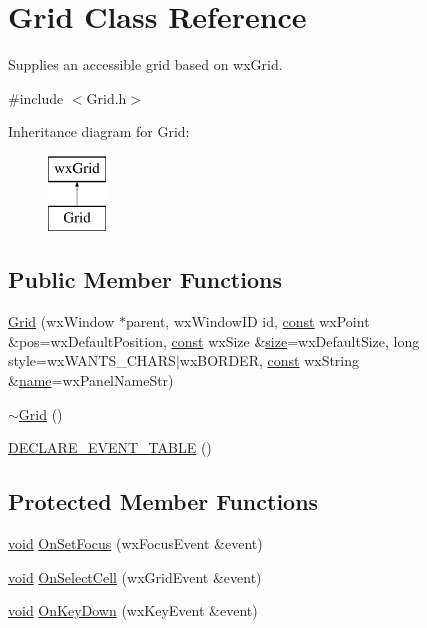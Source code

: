 \hypertarget{class_grid}{}\section{Grid Class Reference}
\label{class_grid}


Supplies an accessible grid based on wx\+Grid.  




{\ttfamily \#include $<$Grid.\+h$>$}

Inheritance diagram for Grid\+:\begin{figure}[H]
\begin{center}
\leavevmode
\includegraphics[height=2.000000cm]{class_grid}
\end{center}
\end{figure}
\subsection*{Public Member Functions}
\begin{DoxyCompactItemize}
\item 
\hyperlink{class_grid_ac23d188d142fd0e099af6c47314a864c}{Grid} (wx\+Window $\ast$parent, wx\+Window\+ID id, \hyperlink{getopt1_8c_a2c212835823e3c54a8ab6d95c652660e}{const} wx\+Point \&pos=wx\+Default\+Position, \hyperlink{getopt1_8c_a2c212835823e3c54a8ab6d95c652660e}{const} wx\+Size \&\hyperlink{group__lavu__mem_ga854352f53b148adc24983a58a1866d66}{size}=wx\+Default\+Size, long style=wx\+W\+A\+N\+T\+S\+\_\+\+C\+H\+A\+RS$\vert$wx\+B\+O\+R\+D\+ER, \hyperlink{getopt1_8c_a2c212835823e3c54a8ab6d95c652660e}{const} wx\+String \&\hyperlink{lib_2expat_8h_a1b49b495b59f9e73205b69ad1a2965b0}{name}=wx\+Panel\+Name\+Str)
\item 
\hyperlink{class_grid_a3661d0a7f998caaaf8627d7a67072116}{$\sim$\+Grid} ()
\item 
\hyperlink{class_grid_a08e6bf52084631d71ba42d0cf6f0290d}{D\+E\+C\+L\+A\+R\+E\+\_\+\+E\+V\+E\+N\+T\+\_\+\+T\+A\+B\+LE} ()
\end{DoxyCompactItemize}
\subsection*{Protected Member Functions}
\begin{DoxyCompactItemize}
\item 
\hyperlink{sound_8c_ae35f5844602719cf66324f4de2a658b3}{void} \hyperlink{class_grid_a931fa5ef31befdac9d2f04384e54772f}{On\+Set\+Focus} (wx\+Focus\+Event \&event)
\item 
\hyperlink{sound_8c_ae35f5844602719cf66324f4de2a658b3}{void} \hyperlink{class_grid_a4b6e0f4d4867bdecb3a3e6c623918780}{On\+Select\+Cell} (wx\+Grid\+Event \&event)
\item 
\hyperlink{sound_8c_ae35f5844602719cf66324f4de2a658b3}{void} \hyperlink{class_grid_a4b0a0a3ba6ed37661b3ffb05538ab4db}{On\+Key\+Down} (wx\+Key\+Event \&event)
\end{DoxyCompactItemize}



